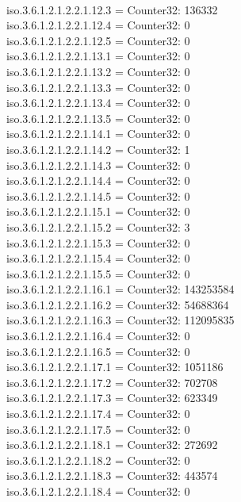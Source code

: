 \documentclass[a4paper,titlepage]{article}
\begin{document}
\begin{center}
{\\iso.3.6.1.2.1.2.2.1.12.3 = Counter32: 136332
\\iso.3.6.1.2.1.2.2.1.12.4 = Counter32: 0
\\iso.3.6.1.2.1.2.2.1.12.5 = Counter32: 0
\\iso.3.6.1.2.1.2.2.1.13.1 = Counter32: 0
\\iso.3.6.1.2.1.2.2.1.13.2 = Counter32: 0
\\iso.3.6.1.2.1.2.2.1.13.3 = Counter32: 0
\\iso.3.6.1.2.1.2.2.1.13.4 = Counter32: 0
\\iso.3.6.1.2.1.2.2.1.13.5 = Counter32: 0
\\iso.3.6.1.2.1.2.2.1.14.1 = Counter32: 0
\\iso.3.6.1.2.1.2.2.1.14.2 = Counter32: 1
\\iso.3.6.1.2.1.2.2.1.14.3 = Counter32: 0
\\iso.3.6.1.2.1.2.2.1.14.4 = Counter32: 0
\\iso.3.6.1.2.1.2.2.1.14.5 = Counter32: 0
\\iso.3.6.1.2.1.2.2.1.15.1 = Counter32: 0
\\iso.3.6.1.2.1.2.2.1.15.2 = Counter32: 3
\\iso.3.6.1.2.1.2.2.1.15.3 = Counter32: 0
\\iso.3.6.1.2.1.2.2.1.15.4 = Counter32: 0
\\iso.3.6.1.2.1.2.2.1.15.5 = Counter32: 0
\\iso.3.6.1.2.1.2.2.1.16.1 = Counter32: 143253584
\\iso.3.6.1.2.1.2.2.1.16.2 = Counter32: 54688364
\\iso.3.6.1.2.1.2.2.1.16.3 = Counter32: 112095835
\\iso.3.6.1.2.1.2.2.1.16.4 = Counter32: 0
\\iso.3.6.1.2.1.2.2.1.16.5 = Counter32: 0
\\iso.3.6.1.2.1.2.2.1.17.1 = Counter32: 1051186
\\iso.3.6.1.2.1.2.2.1.17.2 = Counter32: 702708
\\iso.3.6.1.2.1.2.2.1.17.3 = Counter32: 623349
\\iso.3.6.1.2.1.2.2.1.17.4 = Counter32: 0
\\iso.3.6.1.2.1.2.2.1.17.5 = Counter32: 0
\\iso.3.6.1.2.1.2.2.1.18.1 = Counter32: 272692
\\iso.3.6.1.2.1.2.2.1.18.2 = Counter32: 0
\\iso.3.6.1.2.1.2.2.1.18.3 = Counter32: 443574
\\iso.3.6.1.2.1.2.2.1.18.4 = Counter32: 0
}
\end{center}
\end{document}
